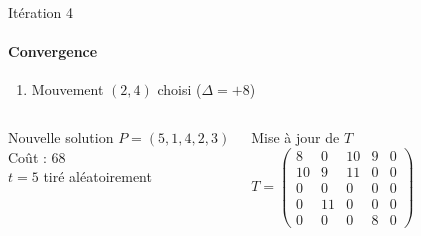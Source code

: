 \documentclass[10pt, handout]{beamer}
\begin{document}
\begin{frame}{Itération 4}
    \framesubtitle{Convergence}


    \begin{enumerate}
        \item Mouvement \( (2,4) \) choisi (\( \Delta = +8 \))
    \end{enumerate}

    \begin{columns}
        \begin{alertblock}{Nouvelle solution}
            \( P = (5, 1, 4, 2, 3) \) \\
            Coût : 68 \\
            \( t = 5 \) tiré aléatoirement
        \end{alertblock}

        \begin{exampleblock}{Mise à jour de \( T \)}
            \[
                T = \begin{pmatrix}
                    8  & 0  & 10 & 9 & 0 \\
                    10 & 9  & 11 & 0 & 0 \\
                    0  & 0  & 0  & 0 & 0 \\
                    0  & 11 & 0  & 0 & 0 \\
                    0  & 0  & 0  & 8 & 0
                \end{pmatrix}
            \]
        \end{exampleblock}
    \end{columns}
\end{frame}
\end{document}
